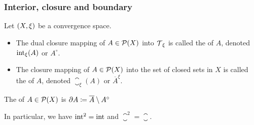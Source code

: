 \subsubsection{Interior, closure and boundary}
\begin{definition}
Let $\sSet{X,\xi}$ be a convergence space.
\begin{itemize}
\item The dual closure mapping of $A\in \operatorname{\mathcal{P}}(X)$ into $\operatorname{\mathcal{T}}_\xi$ is called the  of $A$, denoted $\operatorname{int}_\xi(A)$ or $A^\circ$. 
\item The closure mapping of $A\in \operatorname{\mathcal{P}}(X)$ into the set of closed sets in $X$ is called the  of $A$, denoted $\closure_\xi(A)$ or $\overline{A}^\xi$. 
\end{itemize}
The  of $A\in\operatorname{\mathcal{P}}(X)$ is $\partial A \coloneqq \overline{A}\setminus A^{\circ}$
\end{definition}

In particular, we have $\operatorname{int}^2 = \operatorname{int}$ and $\closure^2 = \closure$.

